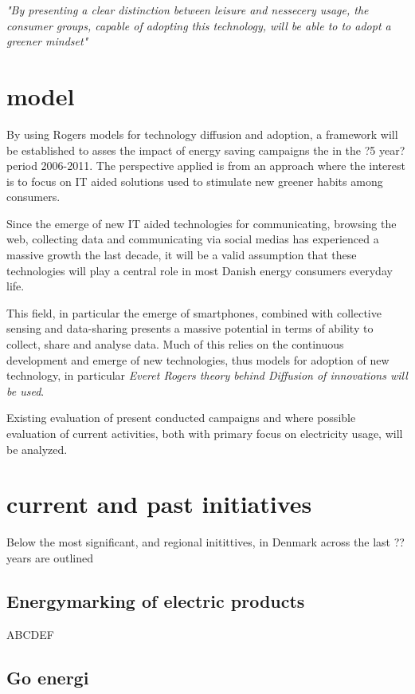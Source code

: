 \documentclass[conference]{IEEEtran}
\begin{document}
\textit{"By presenting a clear distinction between leisure and nessecery usage, the consumer groups, capable of adopting this technology, will be able to to adopt a greener mindset"}

\section{model}
By using Rogers models for technology diffusion and adoption, a framework will be established to asses the impact of energy saving campaigns the in the ?5 year? period 2006-2011.
The perspective applied is from an approach where the interest is to focus on IT aided solutions used to stimulate new greener habits among consumers.

Since the emerge of new IT aided technologies for communicating,  browsing the web, collecting data and communicating via social medias has experienced a massive growth the last decade, it will be a valid assumption that these technologies will play a central role in most Danish energy consumers everyday life.

This field, in particular the emerge of smartphones, combined with collective sensing and data-sharing presents a massive potential in terms of ability to collect, share and analyse data. Much of this relies on the continuous development and emerge of new technologies, thus models for adoption of new technology, in particular \textit{Everet Rogers theory behind Diffusion of innovations will be used}.

Existing evaluation of present conducted campaigns and where possible evaluation of current activities, both with primary focus on electricity usage, will be analyzed.


\section{current and past initiatives}
Below the most significant, and regional initittives, in Denmark across the last ?? years are outlined

\subsection{Energymarking of electric products}
ABCDEF

\subsection{Go energi}
\end{document}
